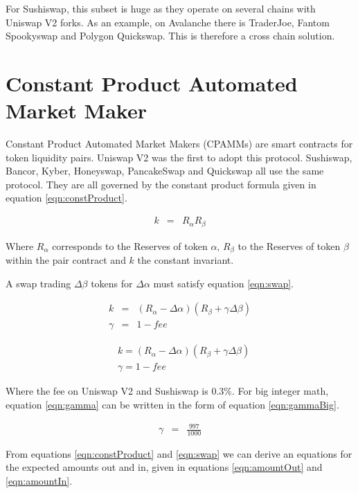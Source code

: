 \documentclass{article}
\begin{document}
For Sushiswap, this subset is huge as they operate on several chains with Uniswap V2 forks. As an example, on Avalanche there is TraderJoe, Fantom Spookyswap and Polygon Quickswap. This is therefore a cross chain solution.





\section{Constant Product Automated Market Maker}
Constant Product Automated Market Makers (CPAMMs) are smart contracts for token liquidity pairs. Uniswap V2 was the first to adopt this protocol. Sushiswap, Bancor, Kyber, Honeyswap, PancakeSwap and Quickswap all use the same protocol. They are all governed by the constant product formula given in equation \ref{eqn:constProduct}.

\begin{eqnarray}
	k  &=& R_{\alpha}  R_{\beta}  \label{eqn:constProduct}
\end{eqnarray}

Where \(R_{\alpha}\) corresponds to the Reserves of token \(\alpha\), \(R_{\beta}\) to the Reserves of token \(\beta\) within the pair contract and \( k \) the constant invariant.

A swap trading \( \Delta\beta\) tokens for \( \Delta\alpha \) must satisfy equation \ref{eqn:swap}.

\begin{eqnarray}
	k  &=& (R_{\alpha} - \Delta\alpha)  (R_{\beta} + \gamma\Delta\beta ) \label{eqn:swap}\\
	\gamma  &=& 1 - fee \label{eqn:gamma}
\end{eqnarray}

$$
	\begin{aligned}
		 & k=\left(R_{\alpha}-\Delta \alpha\right)\left(R_{\beta}+\gamma \Delta \beta\right) \\
		 & \gamma=1-f e e
	\end{aligned}
$$

Where the fee on Uniswap V2 and Sushiswap is 0.3\%. For big integer math, equation \ref{eqn:gamma} can be written in the form of equation \ref{eqn:gammaBig}.

\begin{eqnarray}
	\gamma  &=& \frac{997}{1000} \label{eqn:gammaBig}
\end{eqnarray}

From equations \ref{eqn:constProduct} and \ref{eqn:swap} we can derive an equations for the expected amounts out and in, given in equations \ref{eqn:amountOut} and \ref{eqn:amountIn}.
\end{document}
